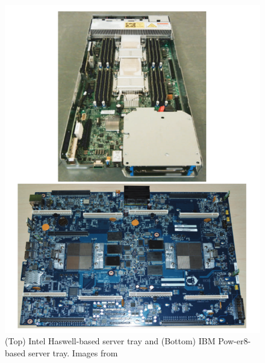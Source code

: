 \begin{figure} [!h]
\centering
\includegraphics[scale=.5]{methodology/images/server_image.png}
\caption[Barroso's Servers]{(Top) Intel Haswell-based server tray and (Bottom) IBM Pow-er8-based server tray.  Images from \cite{barroso13}}
\label{img_server}
\end{figure}